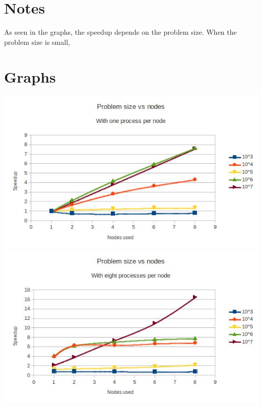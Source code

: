 \documentclass[12pt]{article}
\begin{document}
\maketitle
\section{Notes}
As seen in the graphs, the speedup depends on the problem size. When the problem size is small,
\clearpage
\section{Graphs}
\includegraphics[width=\textwidth]{oneproc.jpg}
\includegraphics[width=\textwidth]{eightproc.jpg}
\end{document}
